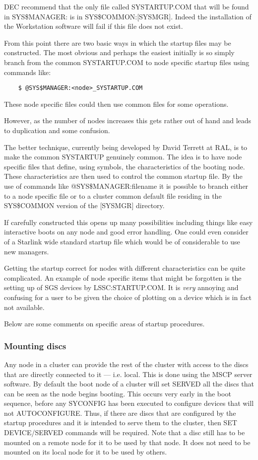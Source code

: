 DEC recommend that the only file called SYSTARTUP.COM that will be found in
SYS\$MANAGER: is in SYS\$COMMON:[SYSMGR].
Indeed the installation of the Workstation software will fail if this file does
not exist.

From this point there are two basic ways in which the startup files may be
constructed.
The most obvious and perhaps the easiest initially is so simply branch from
the common SYSTARTUP.COM to node specific startup files using commands like:
\begin{verbatim}
    $ @SYS$MANAGER:<node>_SYSTARTUP.COM
\end{verbatim}
These node specific files could then use common files for some operations.

However, as the number of nodes increases this gets rather out of hand and
leads to duplication and some confusion.

The better technique, currently being developed by David Terrett at RAL, is
to make the common SYSTARTUP genuinely common.
The idea is to have node specific files that define, using symbols, the
characteristics of the booting node.
These characteristics are then used to control the common startup file.
By the use of commands like @SYS\$MANAGER:filename it is possible to
branch either to a node specific file or to a cluster common default file
residing in the SYS\$COMMON version of the [SYSMGR] directory.

If carefully constructed this opens up many possibilities including things
like easy interactive boots on any node and good error handling.
One could even consider of a Starlink wide standard startup file which would
be of considerable to use new managers.

Getting the startup correct for nodes with different characteristics can be
quite complicated.
An example of node specific items that might be forgotten is the setting up
of SGS devices by LSSC:STARTUP.COM.
It is {\em very} annoying and confusing for a user to be given the choice of
plotting on a device which is in fact not available.

Below are some comments on specific areas of startup procedures.

\subsubsection {Mounting discs}

Any node in a cluster can provide the rest of the cluster with access to the
discs that are directly connected to it --- i.e. local.
This is done using the MSCP server software.
By default the boot node of a cluster will set SERVED all the discs that can be
seen as the node begins booting.
This occurs very early in the boot sequence, before any SYCONFIG has been
executed to configure devices that will not AUTOCONFIGURE.
Thus, if there are discs that are configured by the startup procedures and
it is intended to serve them to the cluster, then SET DEVICE/SERVED commands
will be required.
Note that a disc still has to be mounted on a remote node for it to be used by
that node.
It does not need to be mounted on its local node for it to be used by others.

